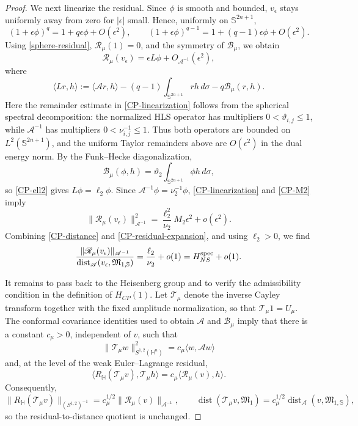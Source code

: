 \documentclass[11pt]{article}
\begin{document}
\begin{proof}
We next linearize the residual. Since $\phi$ is smooth and bounded, $v_\epsilon$ stays uniformly away from zero for $|\epsilon|$ small. Hence, uniformly on $\mathbb S^{2n+1}$,
\[
 (1+\epsilon\phi)^q=1+q\epsilon\phi+O(\epsilon^2),
 \qquad
 (1+\epsilon\phi)^{q-1}=1+(q-1)\epsilon\phi+O(\epsilon^2).
\]
Using \eqref{sphere-residual}, $\mathscr R_\mu(1)=0$, and the symmetry of $\mathcal B_\mu$, we obtain
\begin{equation}\label{CP-linearization}
 \mathscr R_\mu(v_\epsilon)=\epsilon L\phi+O_{\mathscr A^{-1}}(\epsilon^2),
\end{equation}
where
\[
 \langle Lr,h\rangle
 :=\langle\mathscr Ar,h\rangle
 -(q-1)\int_{\mathbb S^{2n+1}}rh\,d\sigma
 -q\mathcal B_\mu(r,h).
\]
Here the remainder estimate in \eqref{CP-linearization} follows from the spherical spectral decomposition: the normalized HLS operator has multipliers $0<\vartheta_{i,j}\le1$, while $\mathscr A^{-1}$ has multipliers $0<\nu_{i,j}^{-1}\le1$. Thus both operators are bounded on $L^2(\mathbb S^{2n+1})$, and the uniform Taylor remainders above are $O(\epsilon^2)$ in the dual energy norm. By the Funk--Hecke diagonalization,
\[
 \mathcal B_\mu(\phi,h)=\vartheta_2
 \int_{\mathbb S^{2n+1}}\phi h\,d\sigma,
\]
so \eqref{CP-ell2} gives $L\phi=\ell_2\phi$. Since $\mathscr A^{-1}\phi=\nu_2^{-1}\phi$, \eqref{CP-linearization} and \eqref{CP-M2} imply
\begin{equation}\label{CP-residual-expansion}
 \|\mathscr R_\mu(v_\epsilon)\|_{\mathscr A^{-1}}^2
 =\frac{\ell_2^2}{\nu_2}M_2\epsilon^2+o(\epsilon^2).
\end{equation}
Combining \eqref{CP-distance} and \eqref{CP-residual-expansion}, and using $\ell_2>0$, we find
\begin{equation}\label{CP-quotient-limit}
 \frac{\|\mathscr R_\mu(v_\epsilon)\|_{\mathscr A^{-1}}}
 {\operatorname{dist}_{\mathscr A}(v_\epsilon,\mathfrak M_{1,\mathbb S})}
 =\frac{\ell_2}{\nu_2}+o(1)
 =H_{NS}^{\rm spec}+o(1).
\end{equation}

It remains to pass back to the Heisenberg group and to verify the admissibility condition in the definition of $H_{CP}(1)$. Let $\mathcal T_\mu$ denote the inverse Cayley transform together with the fixed amplitude normalization, so that $\mathcal T_\mu 1=U_\mu$. The conformal covariance identities used to obtain $\mathscr A$ and $\mathcal B_\mu$ imply that there is a constant $c_\mu>0$, independent of $v$, such that
\[
 \|\mathcal T_\mu w\|_{S^{1,2}(\mathbb H^n)}^2
 =c_\mu\langle w,\mathscr Aw\rangle
\]
and, at the level of the weak Euler--Lagrange residual,
\[
 \big\langle R_{\mathbb H}(\mathcal T_\mu v),\mathcal T_\mu h\big\rangle
 =c_\mu\big\langle\mathscr R_\mu(v),h\big\rangle.
\]
Consequently,
\[
 \|R_{\mathbb H}(\mathcal T_\mu v)\|_{(S^{1,2})^{-1}}
 =c_\mu^{1/2}\|\mathscr R_\mu(v)\|_{\mathscr A^{-1}},
 \qquad
 \operatorname{dist}(\mathcal T_\mu v,\mathfrak M_1)
 =c_\mu^{1/2}\operatorname{dist}_{\mathscr A}(v,\mathfrak M_{1,\mathbb S}),
\]
so the residual-to-distance quotient is unchanged.


\end{proof}
\end{document}

